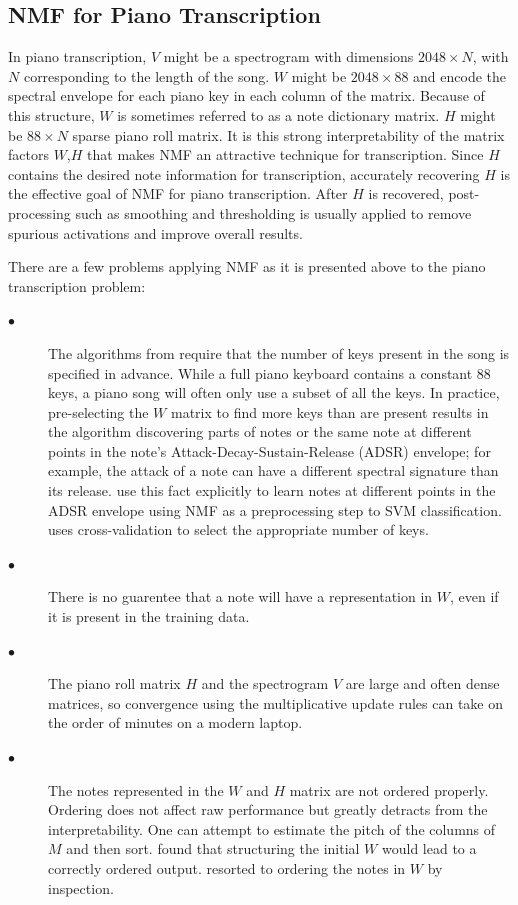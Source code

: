 \documentclass[5p]{elsarticle}
\begin{document}
\subsection{NMF for Piano Transcription}
In piano transcription, $V$ might be a spectrogram with dimensions $2048 \times N$, with $N$ corresponding to the length of the song. $W$ might be $2048 \times 88$ and encode the spectral envelope for each piano key in each column of the matrix. Because of this structure, $W$ is sometimes referred to as a note dictionary matrix. $H$ might be $88 \times N$ sparse piano roll matrix. It is this strong interpretability of the matrix factors $W$,$H$ that makes NMF an attractive technique for transcription.  Since $H$ contains the desired note information for transcription, accurately recovering $H$ is the effective goal of NMF for piano transcription. After $H$ is recovered, post-processing such as smoothing and thresholding is usually applied to remove spurious activations and improve overall results.


There are a few problems applying NMF as it is presented above to the piano transcription problem:

\begin{description}
\item[$\bullet$] The algorithms from \citet{seung2001algorithms} require that the number of keys present in the song is specified in advance. While a full piano keyboard contains a constant 88 keys, a piano song will often only use a subset of all the keys. In practice, pre-selecting the $W$ matrix to find more keys than are present results in the algorithm discovering parts of notes or the same note at different points in the note's Attack-Decay-Sustain-Release (ADSR) envelope; for example, the attack of a note can have a different spectral signature than its release. \citet{weninger2013discriminative} use this fact explicitly to learn notes at different points in the ADSR envelope using NMF as a preprocessing step to SVM classification. \citet{} uses cross-validation to select the appropriate number of keys.
\item[$\bullet$] There is no guarentee that a note will have a representation in $W$, even if it is present in the training data.
\item[$\bullet$] The piano roll matrix $H$ and the spectrogram $V$ are large and often dense matrices, so convergence using the multiplicative update rules can take on the order of minutes on a modern laptop.
\item[$\bullet$] The notes represented in the $W$ and $H$ matrix are not ordered properly. Ordering does not affect raw performance but greatly detracts from the interpretability. One can attempt to estimate the pitch of the columns of $M$ and then sort. \citet{abdallah2004polyphonic} found that structuring the initial $W$ would lead to a correctly ordered output. \citet{boulangerlewandowski2012} resorted to ordering the notes in $W$ by inspection.
\end{description}
\end{document}
